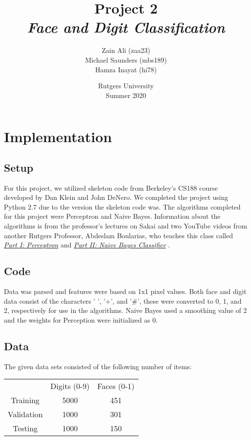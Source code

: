 \documentclass[titlepage]{article}
\title{\textbf{Project 2}\\\emph{Face and Digit Classification}}
\author{
    Zain Ali (zaa23)\\
    Michael Saunders (mbs189)\\
    Hamza Inayat (hi78)\\
}
\date{Rutgers University\\Summer 2020}
\begin{document}
\maketitle

\section{Implementation}

\subsection{Setup}
For this project, we utilized skeleton code from Berkeley's CS188 course developed by Dan Klein and John DeNero. We completed the project using Python 2.7 due to the version the skeleton code was. The algorithms completed for this project were Perceptron and Naive Bayes. Information about the algorithms is from the professor's lectures on Sakai and two YouTube videos from another Rutgers Professor, Abdeslam Boularias,  who teaches this class called \href{https://www.youtube.com/watch?v=R2XgpDQro9k&t=1593s}{\emph{Part I: Perceptron}} and \href{https://www.youtube.com/watch?v=YVwT--QiZGA}{\emph{Part II: Naive Bayes Classifier}} .

\subsection{Code}
Data was parsed and features were based on 1x1 pixel values. Both face and digit data consist of the characters ' ', '+', and '\#', these were converted to 0, 1, and 2, respectively for use in the algorithms. Naive Bayes used a smoothing value of 2 and the weights for Perception were initialized as 0. \\

\subsection{Data}
The given data sets consisted of the following number of items:\\

\begin{center}
\begin{tabular}{c|c|c}
     & Digits (0-9) & Faces (0-1)  \\
    Training & 5000 & 451\\
    Validation & 1000 & 301\\
    Testing & 1000 & 150\\
\end{tabular}
\end{center}
\end{document}
